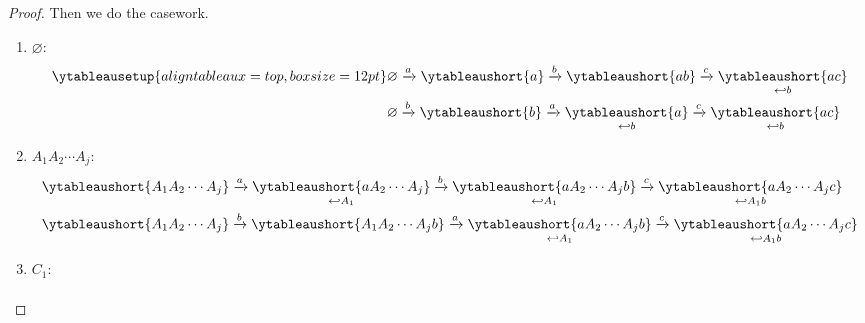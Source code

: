 \documentclass{article}
\begin{document}
\begin{proof}
    Then we do the casework.
    \makeatletter
    \def\font@YT{\scriptstyle}
    \makeatother
    \begin{enumerate}
        \item 
            $\varnothing$:
            \begin{align*}
                \ytableausetup{aligntableaux=top, boxsize=12pt}
                &
                \varnothing
                \xrightarrow{a}
                \ytableaushort{a} 
                \xrightarrow{b}
                \ytableaushort{ab}
                \xrightarrow{c}
                \underset{
                    \hookleftarrow b
                }{\ytableaushort{ac}}
                \\
                &
                \varnothing
                \xrightarrow{b}
                \ytableaushort{b} 
                \xrightarrow{a}
                \underset{
                    \hookleftarrow b
                }{\ytableaushort{a}}
                \xrightarrow{c}
                \underset{
                    \hookleftarrow b
                }{\ytableaushort{ac}}
            \end{align*}
        \item 
            $A_1 A_2 \cdots A_j$:
            \begin{align*}
                &
                \ytableaushort{{A_1}{A_2}\cdots{A_j}}
                \xrightarrow{a}
                \underset{
                    \hookleftarrow A_1
                }{\ytableaushort{a{A_2}\cdots{A_j}}}
                \xrightarrow{b}
                \underset{
                    \hookleftarrow A_1
                }{\ytableaushort{a{A_2}\cdots{A_j}b}}
                \xrightarrow{c}
                \underset{
                    \hookleftarrow A_1b
                }{\ytableaushort{a{A_2}\cdots{A_j}c}}
                \\
                &
                \ytableaushort{{A_1}{A_2}\cdots{A_j}}
                \xrightarrow{b}
                \ytableaushort{{A_1}{A_2}\cdots{A_j}b}
                \xrightarrow{a}
                \underset{
                    \hookleftarrow A_1
                }{\ytableaushort{a{A_2}\cdots{A_j}b}}
                \xrightarrow{c}
                \underset{
                    \hookleftarrow A_1b
                }{\ytableaushort{a{A_2}\cdots{A_j}c}}
            \end{align*}
        \item 
            $C_1$:
            \begin{align*}

\end{align*}
\end{enumerate}
\end{proof}
\end{document}
